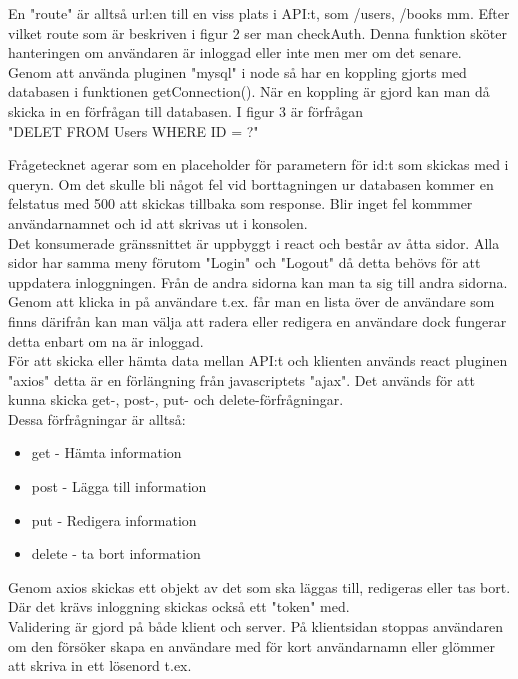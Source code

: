 \documentclass{article}
\begin{document}
\noindent
En "route" är alltså url:en till en viss plats i API:t, som /users, /books mm.
Efter vilket route som är beskriven i figur 2 ser man checkAuth. Denna funktion sköter hanteringen om användaren är inloggad eller inte men mer om det senare.\\
Genom att använda pluginen "mysql" i node så har en koppling gjorts med databasen i funktionen getConnection(). 
När en koppling är gjord kan man då skicka in en förfrågan till databasen. I figur 3 är förfrågan\\

"DELET FROM Users WHERE ID = ?"\newline

\noindent
Frågetecknet agerar som en placeholder för parametern för id:t som skickas med i queryn.
Om det skulle bli något fel vid borttagningen ur databasen kommer en felstatus med 500 att skickas tillbaka som response. 
Blir inget fel kommmer användarnamnet och id att skrivas ut i konsolen.\\

\noindent
Det konsumerade gränssnittet är uppbyggt i react och består av åtta sidor. Alla sidor har samma meny förutom "Login" och "Logout" då detta behövs för att uppdatera inloggningen. 
Från de andra sidorna kan man ta sig till andra sidorna. 
Genom att klicka in på användare t.ex. får man en lista över de användare som finns därifrån kan man välja att radera eller redigera en användare dock fungerar detta enbart om na är inloggad.\\

\noindent
För att skicka eller hämta data mellan API:t och klienten används react pluginen "axios" detta är en förlängning från javascriptets "ajax". Det används för att kunna skicka get-, post-, put- och delete-förfrågningar.\\

\noindent
Dessa förfrågningar är alltså:
\begin{itemize}
	\item get - Hämta information
	\item post - Lägga till information
	\item put - Redigera information
	\item delete - ta bort information
\end{itemize}
\noindent
Genom axios skickas ett objekt av det som ska läggas till, redigeras eller tas bort. Där det krävs inloggning skickas också ett "token" med.\\

\noindent
Validering är gjord på både klient och server. På klientsidan stoppas användaren om den försöker skapa en användare med för kort användarnamn eller glömmer att skriva in ett lösenord t.ex.\\
\end{document}

